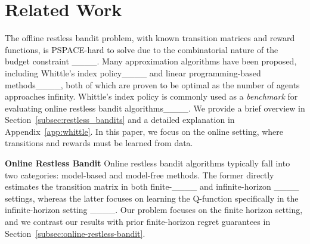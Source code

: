 \section{Related Work}
The offline restless bandit problem, with known transition matrices and reward functions, is 
PSPACE-hard to solve due to the combinatorial nature of the budget constraint 
____.
Many approximation algorithms have been proposed,
including Whittle's index policy____ and linear programming-based methods____, both of which are proven to be optimal as the number of agents approaches infinity.
Whittle's index policy is commonly used as a \emph{benchmark} for evaluating online restless bandit algorithms____. We provide a brief overview in Section~\ref{subsec:restless_bandits} and a detailed explanation in Appendix~\ref{app:whittle}.
In this paper, we focus on the online setting, where transitions and rewards must be learned from data.


\textbf{Online Restless Bandit\;\;} 
Online restless bandit algorithms typically fall into two categories: model-based and model-free methods. The former directly estimates the transition matrix in both finite-____ and infinite-horizon ____ settings, whereas the latter focuses on learning the Q-function specifically in the infinite-horizon setting ____.
Our problem focuses on the finite horizon setting, and we contrast our results with prior finite-horizon regret guarantees in Section~\ref{subsec:online-restless-bandit}.


